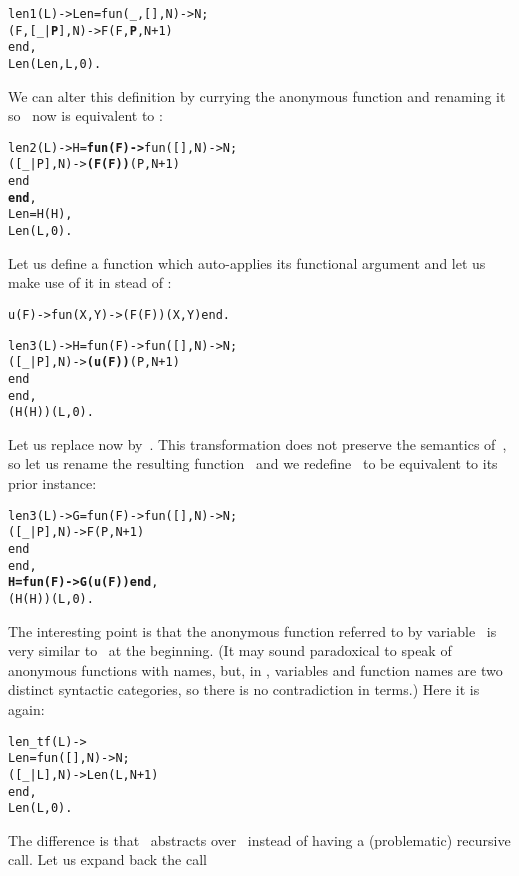 \begin{alltt}
len1(L) -> Len = fun(_,   [],N) -> N;
                    (F,[_|\textbf{P}],N) -> F(F,\textbf{P},N+1)\hfill% \emph{Renaming}
                 end,
           Len(Len,L,0).
\end{alltt}
We can alter this definition by currying the anonymous function and
renaming it so ~now is equivalent to :
\begin{alltt}
len2(L) -> H = \textbf{fun(F) ->} fun(   [],N) -> N;
                            ([_|P],N) -> \textbf{(F(F))}(P,N+1)
                         end
               \textbf{end},
           Len = H(H),\hfill% \emph{Equivalent to} fun len/2
           Len(L,0).
\end{alltt}
Let us define a function  which auto\hyp{}applies its
functional argument and let us make use of it in stead of
:
\begin{alltt}
u(F) -> fun(X,Y) -> (F(F))(X,Y) end.\hfill% \emph{Self\hyp{}application}

len3(L) -> H = fun(F) -> fun(   [],N) -> N;
                            ([_|P],N) -> \textbf{(u(F))}(P,N+1)
                         end
               end,
           (H(H))(L,0).\hfill% \emph{Expanded} Len
\end{alltt}
Let us replace now  by~. This transformation
does not preserve the semantics of~, so let us rename the
resulting function~ and we redefine~ to be
equivalent to its prior instance:
\begin{alltt}
len3(L) -> G = fun(F) -> fun(   [],N) -> N;
                            ([_|P],N) -> F(P,N+1)
                         end
               end,
           \textbf{H = fun(F) -> G(u(F)) end},
           (H(H))(L,0).
\end{alltt}
The interesting point is that the anonymous function referred to by
variable~ is very similar to~ at the
beginning. (It may sound paradoxical to speak of anonymous functions
with names, but, in \Erlang, variables and function names are two
distinct syntactic categories, so there is no contradiction in terms.)
Here it is again:
\begin{alltt}
len_tf(L) -> 
  Len = fun(   [],N) -> N;
           ([_|L],N) -> Len(L,N+1)\hfill% \emph{Unfortunately invalid}
        end,
  Len(L,0).
\end{alltt}
The difference is that ~abstracts over~ instead
of having a (problematic) recursive call. Let us expand back the call
